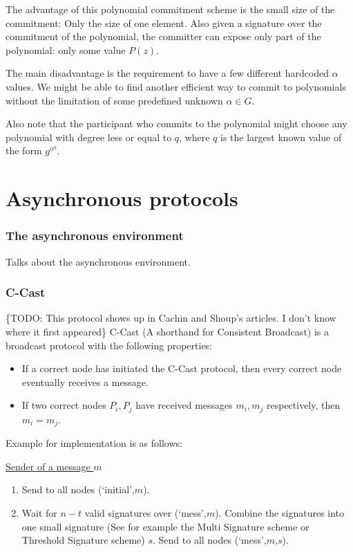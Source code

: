 The advantage of this polynomial commitment scheme is the small size of the
commitment: Only the size of one element. Also given a signature over the
commitment of the polynomial, the committer can expose only part of the
polynomial: only some value $P(z)$.

The main disadvantage is the requirement to have a few different hardcoded
$\alpha$ values. We might be able to find another efficient way to commit to
polynomials without the limitation of some predefined unknown $\alpha \in G$.

Also note that the participant who commits to the polynomial might choose any
polynomial with degree less or equal to $q$, where $q$ is the largest known
value of the form $g^{{\alpha}^q}$.

\part{Asynchronous protocols}
\section{The asynchronous environment}
Talks about the asynchronous environment.

\section{C-Cast}

\{TODO: This protocol shows up in Cachin and Shoup's articles. I don't know
where it first appeared\}
C-Cast (A shorthand for Consistent Broadcast) is a broadcast protocol with the
following properties:
\begin{itemize}
  \item If a correct node has initiated the C-Cast protocol, then every correct
    node eventually receives a message.
  \item If two correct nodes $P_i,P_j$ have received messages $m_i,m_j$
    respectively, then $m_i = m_j$.
\end{itemize}

Example for implementation is as follows:

\uline{Sender of a message $m$}
\begin{enumerate}
  \item Send to all nodes (`initial',$m$).
  \item Wait for $n-t$ valid signatures over (`mess',$m$). Combine the
    signatures into one small signature (See for example the Multi Signature
    scheme or Threshold Signature scheme) $s$. Send to all nodes
    (`mess',$m$,$s$).
\end{enumerate}

